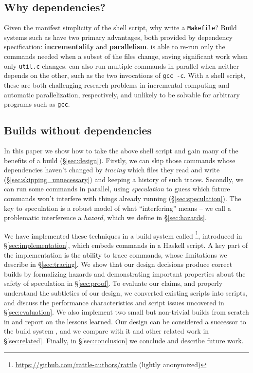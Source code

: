 \subsection{Why dependencies?}

Given the manifest simplicity of the shell script, why write a \texttt{Makefile}? Build systems such as \Make have two primary advantages, both provided by dependency specification: \textbf{incrementality} and \textbf{parallelism}. \Make is able to re-run only the commands needed when a subset of the files change, saving significant work when only \texttt{util.c} changes. \Make can also run multiple commands in parallel when neither depends on the other, such as the two invocations of \texttt{gcc -c}. With a shell script, these are both challenging research problems in incremental computing and automatic parallelization, respectively, and unlikely to be solvable for arbitrary programs such as \texttt{gcc}.

\subsection{Builds without dependencies}

In this paper we show how to take the above shell script and gain many of the benefits of a \Make build (\S\ref{sec:design}). Firstly, we can skip those commands whose dependencies haven't changed by \emph{tracing} which files they read and write (\S\ref{sec:skipping_unnecessary}) and keeping a history of such traces. Secondly, we can run some commands in parallel, using \emph{speculation} to guess which future commands won't interfere with things already running (\S\ref{sec:speculation}). The key to speculation is a robust model of what ``interfering'' means -- we call a problematic interference a \emph{hazard}, which we define in \S\ref{sec:hazards}.

We have implemented these techniques in a build system called \Rattle\footnote{\url{https://github.com/rattle-authors/rattle} (lightly anonymized)}, introduced in \S\ref{sec:implementation}, which embeds commands in a Haskell script. A key part of the implementation is the ability to trace commands, whose limitations we describe in \S\ref{sec:tracing}. We show that our design decisions produce correct builds by formalizing hazards and demonstrating important properties about the safety of speculation in \S\ref{sec:proof}. To evaluate our claims, and properly understand the subtleties of our design, we converted existing \Make scripts into \Rattle scripts, and discuss the performance characteristics and \Make script issues uncovered in \S\ref{sec:evaluation}. We also implement two small but non-trivial builds from scratch in \Rattle and report on the lessons learned. Our design can be considered a successor to the \Memoize build system \cite{memoize}, and we compare \Rattle with it and other related work in \S\ref{sec:related}. Finally, in \S\ref{sec:conclusion} we conclude and describe future work.
